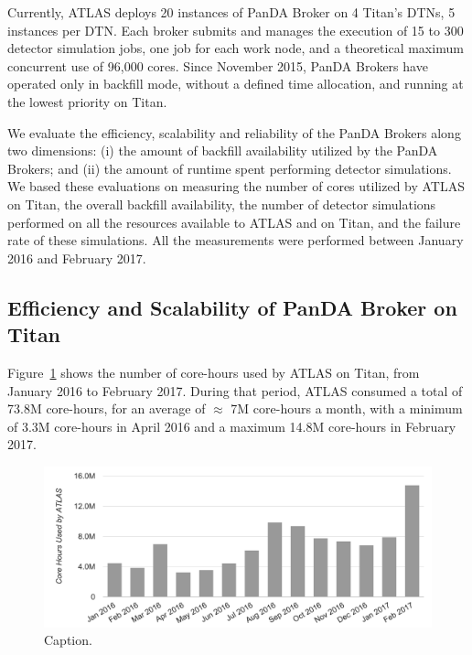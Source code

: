 Currently, ATLAS deploys 20 instances of PanDA Broker on 4 Titan's DTNs, 5
instances per DTN. Each broker submits and manages the execution of 15 to 300
detector simulation jobs, one job for each work node, and a theoretical maximum
concurrent use of 96,000 cores. Since November 2015, PanDA Brokers have operated
only in backfill mode, without a defined time allocation, and running at the
lowest priority on Titan.

We evaluate the efficiency, scalability and reliability of the PanDA Brokers
along two dimensions: (i) the amount of backfill availability utilized by the
PanDA Brokers; and (ii) the amount of %
runtime spent performing detector simulations.  We based these evaluations on measuring the number
of cores utilized by ATLAS on Titan, the overall backfill availability, the
number of detector simulations performed on all the resources available to ATLAS
and on Titan, and the failure rate of these simulations. All the measurements
were performed between January 2016 and February 2017.

\subsection{Efficiency and Scalability of PanDA Broker on Titan}
\label{ssec:panda_titan}

Figure~\ref{fig:core-hours-utilization} shows the number of core-hours used by
ATLAS on Titan, from January 2016 to February 2017. During that period, ATLAS
consumed a total of 73.8M core-hours, for an average of $\approx$ 7M core-hours a month,
with a minimum of 3.3M core-hours in April 2016 and a maximum 14.8M core-hours
in February 2017.

%

\begin{figure}[htp]
\includegraphics[clip,width=\columnwidth]{figures/cpu_hours.png}
\caption{Caption.}
\label{fig:core-hours-utilization}
\end{figure}

